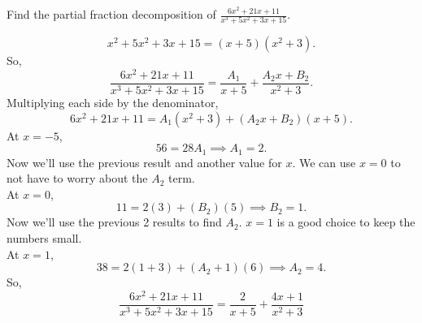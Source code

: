 \begin{example}
	Find the partial fraction decomposition of $\frac{6x^2+21x+11}{x^3+5x^2+3x+15}$.
\end{example}
\begin{answer}
	\begin{equation*}
		x^2+5x^2+3x+15 = (x+5)(x^2+3).
	\end{equation*}
	So,
	\begin{equation*}
		\frac{6x^2+21x+11}{x^3+5x^2+3x+15} = \frac{A_1}{x+5}+\frac{A_2x+B_2}{x^2+3}.
	\end{equation*}
	Multiplying each side by the denominator,
	\begin{equation*}
		6x^2+21x+11 = A_1(x^2+3)+(A_2x+B_2)(x+5).
	\end{equation*}
	At $x=-5$,
	\begin{equation*}
		56 = 28A_1 \implies A_1 = 2.
	\end{equation*}
	Now we'll use the previous result and another value for $x$. We can use $x=0$ to not have to worry about the $A_2$ term.\\
	At $x=0$,
	\begin{equation*}
		11 = 2(3) + (B_2)(5) \implies B_2 = 1.
	\end{equation*}
	Now we'll use the previous 2 results to find $A_2$. $x=1$ is a good choice to keep the numbers small.\\
	At $x=1$,
	\begin{equation*}
		38 = 2(1+3)+(A_2+1)(6) \implies A_2 = 4.
	\end{equation*}
	So,
	\begin{equation*}
		\frac{6x^2+21x+11}{x^3+5x^2+3x+15} = \frac{2}{x+5}+\frac{4x+1}{x^2+3}
	\end{equation*}
\end{answer}